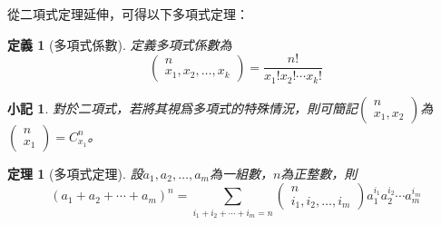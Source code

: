 \documentclass[12pt]{article}
\newtheorem{definition}{定義}
\newtheorem*{theorem}{定理}
\newtheorem*{remark}{小記}
\begin{document}
    從二項式定理延伸，可得以下多項式定理：

    \begin{definition}[多項式係數]
        定義多項式係數為$$\begin{pmatrix}
            n\\x_1,x_2,\dots,x_k
        \end{pmatrix}=\frac{n!}{x_1!x_2!\cdots x_k!}$$
    \end{definition}

    \begin{remark}
        對於二項式，若將其視爲多項式的特殊情況，則可簡記$\begin{pmatrix}
            n\\x_1,x_2
        \end{pmatrix}$為$\begin{pmatrix}
            n\\x_1
        \end{pmatrix}=C_{x_1}^n$。
    \end{remark}

    \begin{theorem}[多項式定理]
        設$a_1,a_2,\dots,a_m$為一組數，$n$為正整數，則$$(a_1+a_2+\cdots+a_m)^n=\sum_{i_1+i_2+\cdots+i_m=n}\begin{pmatrix}
            n\\i_1,i_2,\dots,i_m
        \end{pmatrix}a_1^{i_1}a_2^{i_2}\cdots a_m^{i_m}$$
    \end{theorem}
\end{document}
